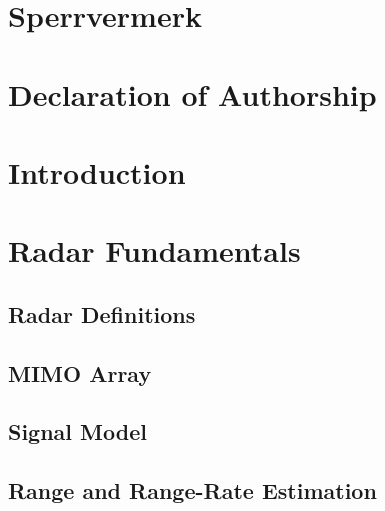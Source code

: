 \documentclass[DIV=15,
fleqn
numbers=noenddot,
headsepline,
captions=tableabove,twoside, openright]{scrreprt}
\begin{document}


\chapter*{Sperrvermerk}

\chapter*{Declaration of Authorship}
\chapter*{}
\vspace*{8cm}
\thispagestyle{empty}

\tableofcontents	
\chapter{Introduction}
	\pagestyle{scrheadings}
	\clearscrheadfoot
	\ihead{\headmark}
	\ohead{\pagemark}

\chapter{Radar Fundamentals}\label{ch:basics}

\section{Radar Definitions}\label{bs:definitions}
 
 \section{MIMO Array}\label{bs:MIMO}
 
\section{Signal Model}\label{bs:signal}

\section{Range and Range-Rate Estimation}\label{bs:range}

\end{document}
